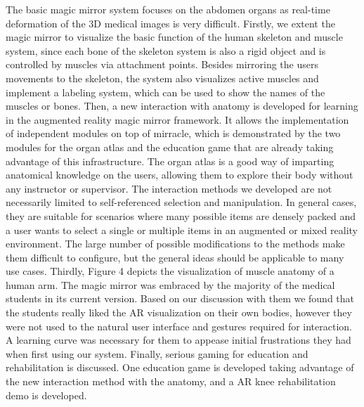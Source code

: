 The basic magic mirror system focuses on the abdomen organs as real-time deformation of the 3D medical images is very difficult. Firstly, we extent the magic mirror to visualize the basic function of the human skeleton and muscle system, since each bone of the skeleton system is also a rigid object and is controlled by muscles via attachment points. Besides mirroring the users movements to the skeleton, the system  also visualizes active muscles and implement a labeling system, which can be used to show the names of the muscles or bones.
Then, a new interaction with anatomy is developed for learning in the augmented reality magic mirror framework. It allows the implementation of independent modules on top of mirracle, which is demonstrated by the two modules for the organ atlas and the education game that are already taking advantage of this infrastructure. The organ atlas is a good way of imparting anatomical knowledge on the users, allowing them to explore their body without any instructor or supervisor.
The interaction methods we developed are not necessarily limited to self-referenced selection and manipulation. In general cases, they are suitable for scenarios where many possible items are densely packed and a user wants to select a single or multiple items in an augmented or mixed reality environment. The large number of possible modifications to the methods make them difficult to configure, but the general ideas should be applicable to many use cases.
Thirdly, Figure 4 depicts the visualization of muscle anatomy of a human arm. The magic mirror was embraced by the majority of the medical students in its current version. Based on our discussion with them we found that the students really liked the AR visualization on their own bodies, however they were not used to the natural user interface and gestures required for interaction. A learning curve was necessary for them to appease initial frustrations they had when first using our system.
Finally, serious gaming for education and rehabilitation is discussed. One education game is developed taking advantage of the new interaction method with the anatomy, and a AR knee rehabilitation demo is developed. 

